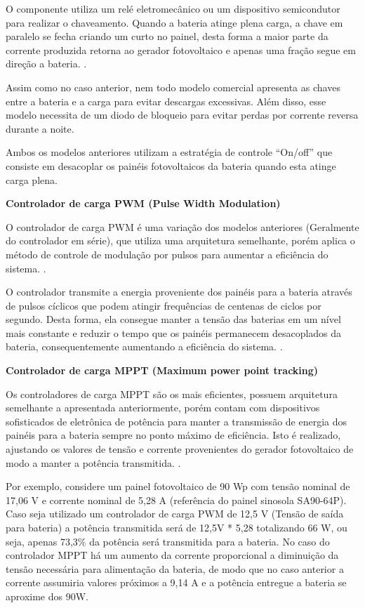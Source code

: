 	O componente utiliza um relé eletromecânico ou um dispositivo semicondutor para realizar o chaveamento. Quando a bateria atinge plena carga, a chave em paralelo se fecha criando um curto no painel, desta forma a maior parte da corrente produzida retorna ao gerador fotovoltaico e apenas uma fração segue em direção a bateria. \cite{Cresesb}.
	
	Assim como no caso anterior, nem todo modelo comercial apresenta as chaves entre a bateria e a carga para evitar descargas excessivas. Além disso, esse modelo necessita de um diodo de bloqueio para evitar perdas por corrente reversa durante a noite.
	
	Ambos os modelos anteriores utilizam a estratégia de controle “On/off” que consiste em desacoplar os painéis fotovoltaicos da bateria quando esta atinge carga plena.  

	\textbf{Controlador de carga PWM (Pulse Width Modulation)}

	O controlador de carga PWM é uma variação dos modelos anteriores (Geralmente do controlador em série), que utiliza uma arquitetura semelhante, porém aplica o método de controle de modulação por pulsos para aumentar a eficiência do sistema. \cite{Saad}.
	
	O controlador transmite a energia proveniente dos painéis para a bateria através de pulsos cíclicos que podem atingir frequências de centenas de ciclos por segundo. Desta forma, ela consegue manter a tensão das baterias em um nível mais constante e reduzir o tempo que os painéis permanecem desacoplados da bateria, consequentemente aumentando a eficiência do sistema. \cite{Saad}.

	\textbf{Controlador de carga MPPT (Maximum power point tracking)}

	Os controladores de carga MPPT são os mais eficientes, possuem arquitetura semelhante a apresentada anteriormente, porém contam com dispositivos sofisticados de eletrônica de potência para manter a transmissão de energia dos painéis para a bateria sempre no ponto máximo de eficiência. Isto é realizado, ajustando os valores de tensão e corrente provenientes do gerador fotovoltaico de modo a manter a potência transmitida. \cite{Cresesb}.
	
	Por exemplo, considere um painel fotovoltaico de 90 Wp com tensão nominal de 17,06 V e corrente nominal de 5,28 A (referência do painel sinosola SA90-64P). Caso seja utilizado um controlador de carga PWM de 12,5 V (Tensão de saída para bateria) a potência transmitida será de 12,5V * 5,28 totalizando 66 W, ou seja, apenas 73,3\% da potência será transmitida para a bateria. No caso do controlador MPPT há um aumento da corrente proporcional a diminuição da tensão necessária para alimentação da bateria, de modo que no caso anterior a corrente assumiria valores próximos a 9,14 A e a potência entregue a bateria se aproxime dos 90W.
	
